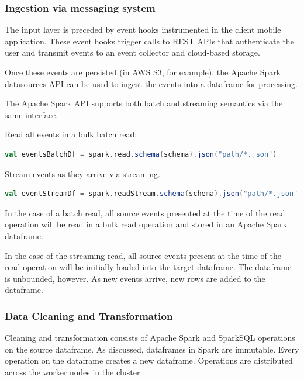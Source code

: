 \documentclass[runningheads,a4paper]{llncs}
\begin{document}
\subsubsection{Ingestion via messaging system}

The input layer is preceded by event hooks instrumented in the client mobile application. These event hooks trigger calls to REST APIs that authenticate the user and transmit events to an event collector and cloud-based storage.

Once these events are persisted (in AWS S3, for example), the Apache Spark datasources API can be used to ingest the events into a dataframe for processing.

The Apache Spark API supports both batch and streaming semantics via the same interface.

Read all events in a bulk batch read:
\begin{lstlisting}[language=Scala, basicstyle = \small, caption={Batch Read of a JSON file}]
 val eventsBatchDf = spark.read.schema(schema).json("path/*.json")
\end{lstlisting}%

Stream events as they arrive via streaming.
\begin{lstlisting}[language=Scala, basicstyle = \small, caption={Streaming Read of a JSON input stream}]
 val eventStreamDf = spark.readStream.schema(schema).json("path/*.json")
\end{lstlisting}%

In the case of a batch read, all source events presented at the time of the read operation will be read in a bulk read operation and stored in an Apache Spark dataframe. 

In the case of the streaming read, all source events present at the time of the read operation will be initially loaded into the target dataframe. The dataframe is unbounded, however. As new events arrive, new rows are added to the dataframe.

\subsubsection{Data Cleaning and Transformation} 

Cleaning and transformation consists of Apache Spark and SparkSQL operations on the source dataframe. As discussed, dataframes in Spark are immutable. Every operation on the dataframe creates a new dataframe. Operations are distributed across the worker nodes in the cluster.
\end{document}
